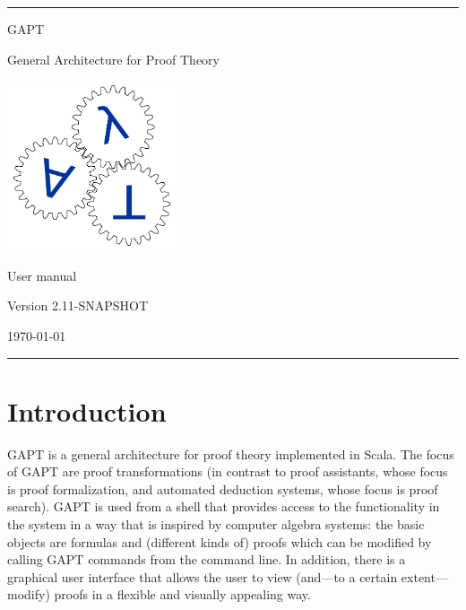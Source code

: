 \documentclass[a4paper,11pt]{book}
\begin{document}
\begin{titlepage}
\begin{center}

\hrule

\vspace*{20mm}

{\Huge GAPT}

\vspace*{5mm}

{\huge General Architecture for Proof Theory}

\vspace*{20mm}

\includegraphics[keepaspectratio,width=5cm]{logo}

\vspace*{20mm}

{\Huge User manual}

\vspace*{10mm}
{\Large Version 2.11-SNAPSHOT}
\vspace*{10mm}

{\Large \today}

\vspace*{20mm}

\hrule
\end{center}

\end{titlepage}

\listoffixmes

\setcounter{tocdepth}{1}
\tableofcontents

\chapter{Introduction}

GAPT is a general architecture for proof theory implemented in Scala.
The focus of GAPT are proof transformations (in contrast to proof assistants,
whose focus is proof formalization, and automated deduction systems, whose focus
is proof search). GAPT is used from a shell that provides access to the functionality
in the system in a way that is inspired by computer algebra systems: the basic
objects are formulas and (different kinds of) proofs which can be modified
by calling GAPT commands from the command line. In addition, there
is a graphical user interface that allows the user to view (and—to a certain extent—
modify) proofs in a flexible and visually appealing way.
\end{document}
